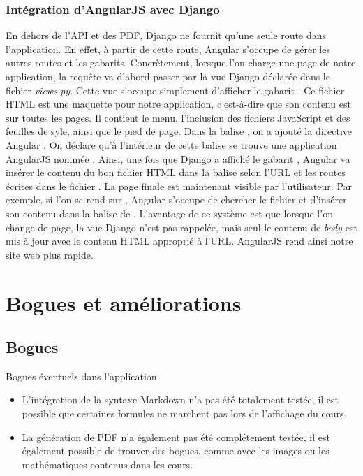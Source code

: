 \documentclass[a4paper,10pt,twoside]{sphinxmanual}
\begin{document}
\subsection{Intégration d'AngularJS avec Django}
\label{guide:integration-d-angularjs-avec-django}
En dehors de l'API et des PDF, Django ne fournit qu'une seule route dans l'application. En effet, à partir de cette route, Angular s'occupe de gérer les autres routes et les gabarits. Concrètement, lorsque l'on charge une page de notre application, la requête va d'abord passer par la vue Django  déclarée dans le fichier \emph{views.py}. Cette vue s'occupe simplement d'afficher le gabarit . Ce fichier HTML est une maquette pour notre application, c'est-à-dire que son contenu est sur toutes les pages. Il contient le menu, l'inclusion des fichiers JavaScript et des feuilles de syle, ainsi que le pied de page. Dans la balise , on a ajouté la directive Angular . On déclare qu'à l'intérieur de cette balise se trouve une application AngularJS nommée . Ainsi, une fois que Django a affiché le gabarit , Angular va insérer le contenu du bon fichier HTML dans la balise  selon l'URL et les routes écrites dans le fichier . La page finale est maintenant visible par l'utilisateur. Par exemple, si l'on se rend sur , Angular s'occupe de chercher le fichier  et d'insérer son contenu dans la balise  de . L'avantage de ce système est que lorsque l'on change de page, la vue Django n'est pas rappelée, mais seul le contenu de \emph{body} est mis à jour avec le contenu HTML approprié à l'URL. AngularJS rend ainsi notre site web plus rapide.


\chapter{Bogues et améliorations}
\label{bugs::doc}\label{bugs:bogues-et-ameliorations}

\section{Bogues}
\label{bugs:bogues}
Bogues éventuels dans l'application.
\begin{itemize}
\item {} 
L'intégration de la syntaxe Markdown n'a pas été totalement testée, il est possible que certaines formules ne marchent pas lors de l'affichage du cours.

\item {} 
La génération de PDF n'a également pas été complétement testée, il est également possible de trouver des bogues, comme avec les images ou  les mathématiques contenus dans les cours.

\end{itemize}
\end{document}
